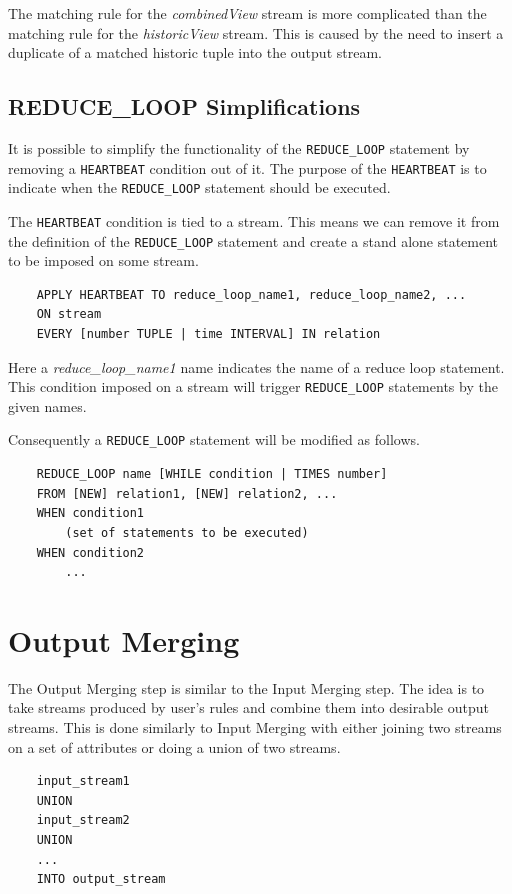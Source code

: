 \documentclass{article}
\begin{document}
The matching rule for the \emph{combinedView} stream is more complicated than the matching rule for the \emph{historicView} stream. This is caused by the need to insert a duplicate of a matched historic tuple into the output stream.

\subsection{REDUCE\_LOOP Simplifications}

It is possible to simplify the functionality of the {\tt REDUCE\_LOOP} statement by removing a {\tt HEARTBEAT} condition out of it. The purpose of the {\tt HEARTBEAT} is to indicate when the {\tt REDUCE\_LOOP} statement should be executed. 

The {\tt HEARTBEAT} condition is tied to a stream. This means we can remove it from the definition of the {\tt REDUCE\_LOOP} statement and create a stand alone statement to be imposed on some stream. 

\begin{verbatim}
    APPLY HEARTBEAT TO reduce_loop_name1, reduce_loop_name2, ...
    ON stream
    EVERY [number TUPLE | time INTERVAL] IN relation
\end{verbatim}

\noindent Here a \emph{reduce\_loop\_name1} name indicates the name of a reduce loop statement. This condition imposed on a stream will trigger {\tt REDUCE\_LOOP} statements by the given names. 

Consequently a {\tt REDUCE\_LOOP} statement will be modified as follows.

\begin{verbatim}
    REDUCE_LOOP name [WHILE condition | TIMES number]
    FROM [NEW] relation1, [NEW] relation2, ... 
    WHEN condition1
        (set of statements to be executed)
    WHEN condition2
        ...
\end{verbatim}

\section{Output Merging}

The Output Merging step is similar to the Input Merging step. The idea is to take streams produced by user's rules and combine them into desirable output streams. This is done similarly to Input Merging with either joining two streams on a set of attributes or doing a union of two streams.

\begin{verbatim}   
    input_stream1
    UNION
    input_stream2
    UNION
    ...
    INTO output_stream
\end{verbatim}
\end{document}
